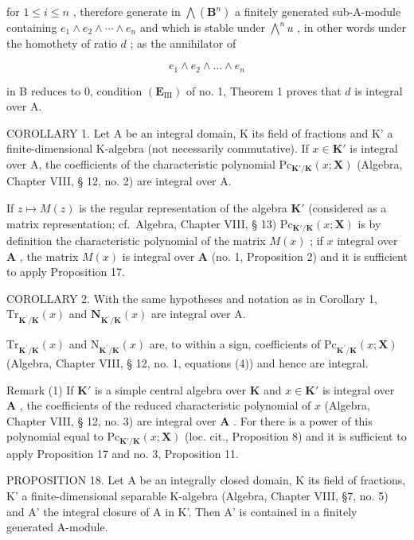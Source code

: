 for \(1 \leqslant i \leqslant n\) , therefore generate in \(\bigwedge (\mathbf{B}^n)\) a finitely generated sub-A-module containing \(e_1 \wedge e_2 \wedge \cdots \wedge e_n\) and which is stable under \(\bigwedge^n u\) , in other words under the homothety of ratio \(d\) ; as the annihilator of

\[
e _ {1} \wedge e _ {2} \wedge \dots \wedge e _ {n}
\]

in B reduces to 0, condition \((\mathbf{E}_{\mathrm{III}})\) of no. 1, Theorem 1 proves that \(d\) is integral over A.

COROLLARY 1. Let A be an integral domain, K its field of fractions and K' a finite-dimensional K-algebra (not necessarily commutative). If \(x \in \mathbf{K}'\) is integral over A, the coefficients of the characteristic polynomial \(\mathrm{Pc}_{\mathbf{K}' / \mathbf{K}}(x; \mathbf{X})\) (Algebra, Chapter VIII, § 12, no. 2) are integral over A.

If \(z \mapsto M(z)\) is the regular representation of the algebra \(\mathbf{K}'\) (considered as a matrix representation; cf.~Algebra, Chapter VIII, § 13) \(\mathrm{Pc}_{\mathbf{K}' / \mathbf{K}}(x; \mathbf{X})\) is by definition the characteristic polynomial of the matrix \(M(x)\) ; if \(x\) integral over \(\mathbf{A}\) , the matrix \(M(x)\) is integral over \(\mathbf{A}\) (no. 1, Proposition 2) and it is sufficient to apply Proposition 17.

COROLLARY 2. With the same hypotheses and notation as in Corollary 1, \(\mathrm{Tr}_{\mathbf{K}^{\prime}/\mathbf{K}}(x)\) and \(\mathbf{N}_{\mathbf{K}^{\prime}/\mathbf{K}}(x)\) are integral over A.

\(\mathrm{Tr}_{\mathbf{K}^{\prime}/\mathbf{K}}(x)\) and \(\mathrm{N}_{\mathbf{K}^{\prime}/\mathbf{K}}(x)\) are, to within a sign, coefficients of \(\mathrm{Pc}_{\mathbf{K}^{\prime}/\mathbf{K}}(x;\mathbf{X})\) (Algebra, Chapter VIII, § 12, no. 1, equations (4)) and hence are integral.

Remark (1) If \(\mathbf{K}'\) is a simple central algebra over \(\mathbf{K}\) and \(x \in \mathbf{K}'\) is integral over \(\mathbf{A}\) , the coefficients of the reduced characteristic polynomial of \(x\) (Algebra, Chapter VIII, § 12, no. 3) are integral over \(\mathbf{A}\) . For there is a power of this polynomial equal to \(\mathrm{Pc}_{\mathbf{K}' / \mathbf{K}}(x; \mathbf{X})\) (loc. cit., Proposition 8) and it is sufficient to apply Proposition 17 and no. 3, Proposition 11.

PROPOSITION 18. Let A be an integrally closed domain, K its field of fractions, K' a finite-dimensional separable K-algebra (Algebra, Chapter VIII, §7, no. 5) and A' the integral closure of A in K'. Then A' is contained in a finitely generated A-module.

